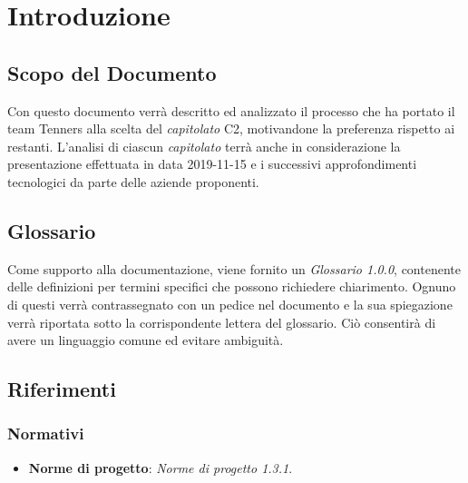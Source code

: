 \section{Introduzione}

\subsection{Scopo del Documento}
Con questo documento verrà descritto ed analizzato il processo che ha portato il team Tenners alla scelta del \textit{capitolato\glo} C2, motivandone la preferenza rispetto ai restanti. L'analisi di ciascun \textit{capitolato\glo} terrà anche in considerazione la presentazione effettuata in data 2019-11-15 e i successivi approfondimenti tecnologici da parte delle aziende proponenti.
	
\subsection{Glossario}
Come supporto alla documentazione, viene fornito un \textit{Glossario 1.0.0}, contenente delle definizioni per termini specifici che possono richiedere chiarimento. Ognuno di questi verrà contrassegnato con un pedice \glo nel documento e la sua spiegazione verrà riportata sotto la corrispondente lettera del glossario. Ciò consentirà di avere un linguaggio comune ed evitare ambiguità. 
	
\subsection{Riferimenti}
\subsubsection{Normativi}
\begin{itemize}
	\item \textbf{Norme di progetto}: \textit{Norme di progetto 1.3.1\docs}.
\end{itemize}

